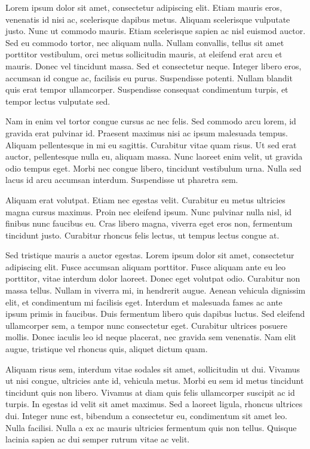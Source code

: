 \documentclass[14pt, a4paper, russian]{report}
\begin{document}
Lorem ipsum dolor sit amet, consectetur adipiscing elit. Etiam mauris eros, venenatis id nisi ac, scelerisque dapibus metus. Aliquam scelerisque vulputate justo. Nunc ut commodo mauris. Etiam scelerisque sapien ac nisl euismod auctor. Sed eu commodo tortor, nec aliquam nulla. Nullam convallis, tellus sit amet porttitor vestibulum, orci metus sollicitudin mauris, at eleifend erat arcu et mauris. Donec vel tincidunt massa. Sed et consectetur neque. Integer libero eros, accumsan id congue ac, facilisis eu purus. Suspendisse potenti. Nullam blandit quis erat tempor ullamcorper. Suspendisse consequat condimentum turpis, et tempor lectus vulputate sed.

Nam in enim vel tortor congue cursus ac nec felis. Sed commodo arcu lorem, id gravida erat pulvinar id. Praesent maximus nisi ac ipsum malesuada tempus. Aliquam pellentesque in mi eu sagittis. Curabitur vitae quam risus. Ut sed erat auctor, pellentesque nulla eu, aliquam massa. Nunc laoreet enim velit, ut gravida odio tempus eget. Morbi nec congue libero, tincidunt vestibulum urna. Nulla sed lacus id arcu accumsan interdum. Suspendisse ut pharetra sem.

Aliquam erat volutpat. Etiam nec egestas velit. Curabitur eu metus ultricies magna cursus maximus. Proin nec eleifend ipsum. Nunc pulvinar nulla nisl, id finibus nunc faucibus eu. Cras libero magna, viverra eget eros non, fermentum tincidunt justo. Curabitur rhoncus felis lectus, ut tempus lectus congue at.

Sed tristique mauris a auctor egestas. Lorem ipsum dolor sit amet, consectetur adipiscing elit. Fusce accumsan aliquam porttitor. Fusce aliquam ante eu leo porttitor, vitae interdum dolor laoreet. Donec eget volutpat odio. Curabitur non massa tellus. Nullam in viverra mi, in hendrerit augue. Aenean vehicula dignissim elit, et condimentum mi facilisis eget. Interdum et malesuada fames ac ante ipsum primis in faucibus. Duis fermentum libero quis dapibus luctus. Sed eleifend ullamcorper sem, a tempor nunc consectetur eget. Curabitur ultrices posuere mollis. Donec iaculis leo id neque placerat, nec gravida sem venenatis. Nam elit augue, tristique vel rhoncus quis, aliquet dictum quam.

Aliquam risus sem, interdum vitae sodales sit amet, sollicitudin ut dui. Vivamus ut nisi congue, ultricies ante id, vehicula metus. Morbi eu sem id metus tincidunt tincidunt quis non libero. Vivamus at diam quis felis ullamcorper suscipit ac id turpis. In egestas id velit sit amet maximus. Sed a laoreet ligula, rhoncus ultrices dui. Integer nunc est, bibendum a consectetur eu, condimentum sit amet leo. Nulla facilisi. Nulla a ex ac mauris ultricies fermentum quis non tellus. Quisque lacinia sapien ac dui semper rutrum vitae ac velit. 
\end{document}
